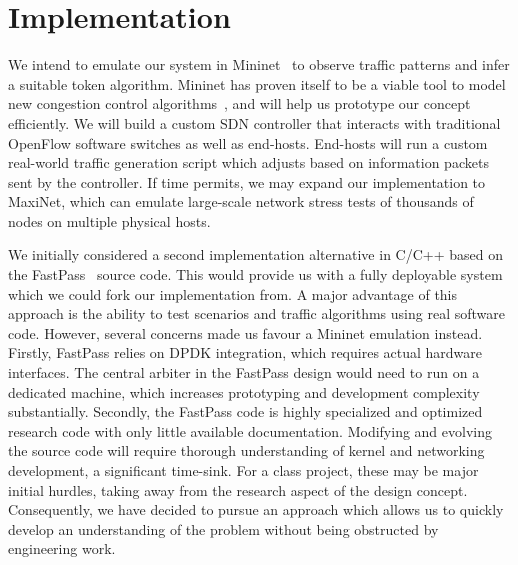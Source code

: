 \section{Implementation}
\label{sec:implementation}
We intend to emulate our system in Mininet~\cite{mininet} to observe traffic patterns and infer a suitable token algorithm. Mininet has proven itself to be a viable tool to model new congestion control algorithms~\cite{mininet_learning}, and will help us prototype our concept efficiently. We will build a custom SDN controller that interacts with traditional OpenFlow software switches as well as end-hosts. End-hosts will run a custom real-world traffic generation script which adjusts based on information packets sent by the controller. 
If time permits, we may expand our implementation to MaxiNet, which can emulate large-scale network stress tests of thousands of nodes on multiple physical hosts.

We initially considered a second implementation alternative in C/C++ based on the FastPass~\cite{fastpass} source code. This would provide us with a fully deployable system which we could fork our implementation from. A major advantage of this approach is the ability to test scenarios and traffic algorithms using real software code. 
However, several concerns made us favour a Mininet emulation instead.
Firstly, FastPass relies on DPDK integration, which requires actual hardware interfaces. The central arbiter in the FastPass design would need to run on a dedicated machine, which increases prototyping and development complexity substantially.
Secondly, the FastPass code is highly specialized and optimized research code with only little available documentation. Modifying and evolving the source code will require thorough understanding of kernel and networking development, a significant time-sink. For a class project, these may be major initial hurdles, taking away from the research aspect of the design concept.
Consequently, we have decided to pursue an approach which allows us to quickly develop an understanding of the problem without being obstructed by engineering work.

